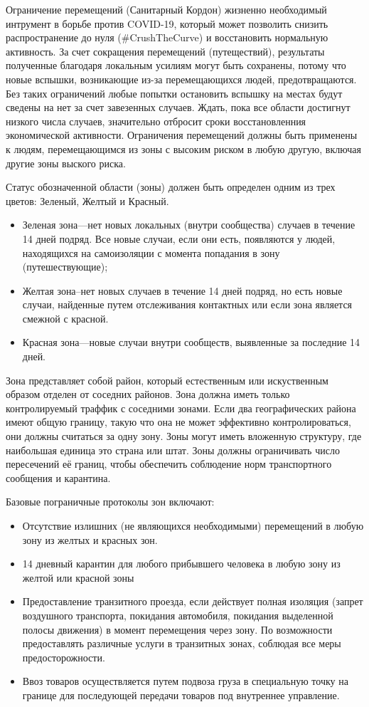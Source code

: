 \documentclass[onecolumn,journal]{IEEEtran}
\begin{document}
\begin{multicols}{2}

Ограничение перемещений (Санитарный Кордон) жизненно необходимый интрумент в борьбе против COVID-19, который может позволить снизить распространение до нуля ($\#$CrushTheCurve) и восстановить нормальную активность. За счет сокращения перемещений (путеществий), результаты полученные благодаря локальным усилиям могут быть сохранены, потому что новые вспышки, возникающие из-за перемещающихся людей, предотвращаются. Без таких ограничений любые попытки остановить вспышку на местах будут сведены на нет за счет завезенных случаев. Ждать, пока все области достигнут низкого числа случаев, значительно отбросит сроки восстановленния экономической активности. Ограничения перемещений должны быть применены к людям, перемещающимся из зоны с высоким риском в любую другую, включая другие зоны выского риска.

Статус обозначенной области (зоны) должен быть определен одним из трех цветов: Зеленый, Желтый и Красный.
\begin{itemize}
\item Зеленая зона---нет новых локальных (внутри сообщества) случаев в течение 14 дней подряд. Все новые случаи, если они есть, появляются у людей, находящихся на самоизоляции с момента попадания в зону (путешествующие);
\item Желтая зона--нет новых случаев в течение 14 дней подряд, но есть новые случаи, найденные путем отслеживания контактных или если зона является смежной с красной.
\item Красная зона---новые случаи внутри сообществ, выявленные за последние 14 дней.
\end{itemize}
Зона представляет собой район, который естественным или искуственным образом отделен от соседних районов. Зона должна иметь только контролируемый траффик с соседними зонами. Если два географических района имеют общую границу, такую что она не может эффективно контролироваться, они должны считаться за одну зону. Зоны могут иметь вложенную структуру, где наибольшая единица это страна или штат. Зоны должны ограничивать число пересечений её границ, чтобы обеспечить соблюдение норм транспортного сообщения и карантина.

Базовые пограничные протоколы зон включают:
\begin{itemize}
\item Отсутствие излишних (не являющихся необходимыми) перемещений в любую зону из желтых и красных зон.
\item 14 дневный карантин для любого прибывшего человека в любую зону из желтой или красной зоны
\item Предоставление транзитного проезда, если действует полная изоляция (запрет воздушного транспорта, покидания автомобиля, покидания выделенной полосы движения) в момент перемещения через зону. По возможности предоставлять различные услуги в транзитных зонах, соблюдая все меры предосторожности.
\item Ввоз товаров осуществляется путем подвоза груза в специальную точку на границе для последующей передачи товаров под внутреннее управление.
\end{itemize}


\end{multicols}
\end{document}
